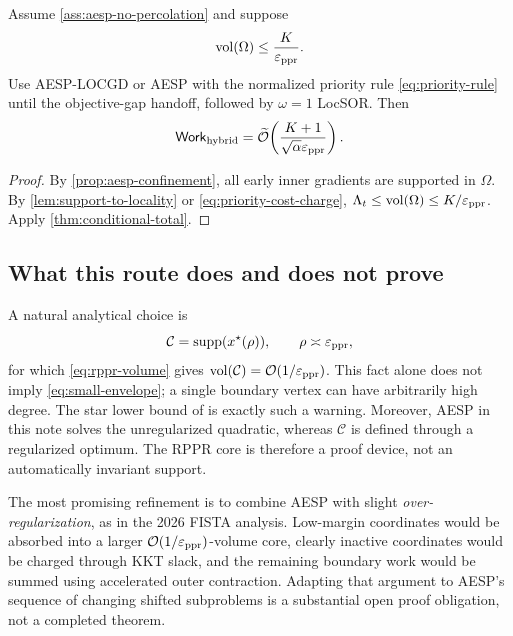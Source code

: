 \begin{theorem}
\label{thm:confinement-total}
Assume \cref{ass:aesp-no-percolation} and suppose
\begin{equation}
    \operatorname{vol}(\Omega)\leq\frac{K}{\varepsilon_{\mathrm{ppr}}}.
    \label{eq:small-envelope}
\end{equation}
Use AESP-LOCGD or AESP with the normalized priority rule
\cref{eq:priority-rule} until the objective-gap handoff, followed by
\(\omega=1\) LocSOR.  Then
\begin{equation}
    \mathsf{Work}_{\rm hybrid}
    =\widetilde{\mathcal O}\!\left(
       \frac{K+1}{\sqrt\alpha\varepsilon_{\mathrm{ppr}}}
    \right).
    \label{eq:confinement-total-work}
\end{equation}
\end{theorem}

\begin{proof}
By \cref{prop:aesp-confinement}, all early inner gradients are supported in
\(\Omega\).  By \cref{lem:support-to-locality} or
\cref{eq:priority-cost-charge},
\(\Lambda_t\leq\operatorname{vol}(\Omega)\leq K/\varepsilon_{\mathrm{ppr}}\).  Apply
\cref{thm:conditional-total}.
\end{proof}

\subsection{What this route does and does not prove}

A natural analytical choice is
\begin{equation}
    \mathcal C=\operatorname{supp}(x^\star(\rho)),
    \qquad \rho\asymp\varepsilon_{\mathrm{ppr}},
    \label{eq:rppr-core-choice}
\end{equation}
for which \cref{eq:rppr-volume} gives
\(\operatorname{vol}(\mathcal C)=\mathcal O(1/\varepsilon_{\mathrm{ppr}})\).  This fact alone does not imply
\cref{eq:small-envelope}; a single boundary vertex can have arbitrarily high
degree.  The star lower bound of \citet{fountoulakis2026complexity} is exactly
such a warning.  Moreover, AESP in this note solves the unregularized
quadratic, whereas \(\mathcal C\) is defined through a regularized optimum.
The RPPR core is therefore a proof device, not an automatically invariant
support.

The most promising refinement is to combine AESP with slight
\emph{over-regularization}, as in the 2026 FISTA analysis.  Low-margin
coordinates would be absorbed into a larger \(\mathcal O(1/\varepsilon_{\mathrm{ppr}})\)-volume
core, clearly inactive coordinates would be charged through KKT slack, and the
remaining boundary work would be summed using accelerated outer contraction.
Adapting that argument to AESP's sequence of changing shifted subproblems is a
substantial open proof obligation, not a completed theorem.
